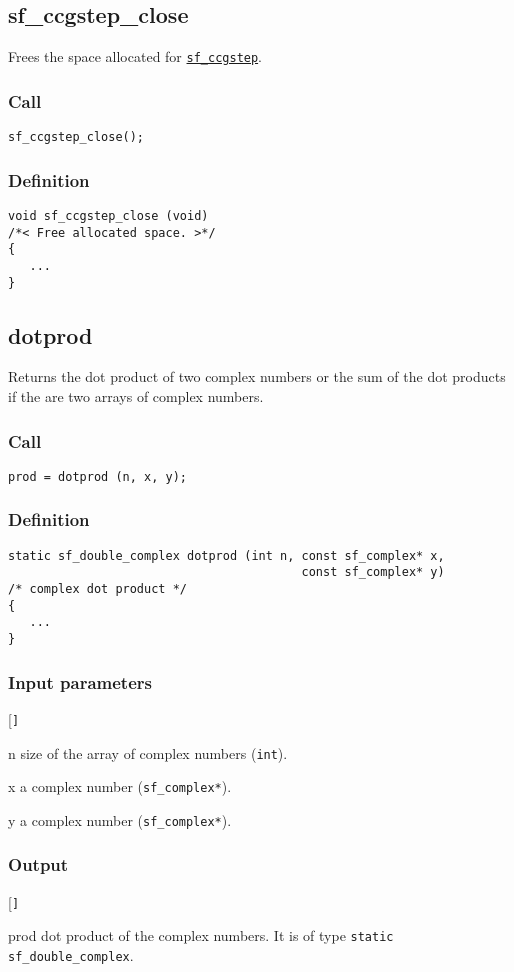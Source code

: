 \subsection{{sf\_ccgstep\_close}}
Frees the space allocated for \hyperref[sec:sf_ccgstep]{\texttt{sf\_ccgstep}}.

\subsubsection*{Call}
\begin{verbatim}sf_ccgstep_close();\end{verbatim}

\subsubsection*{Definition}
\begin{verbatim}
void sf_ccgstep_close (void) 
/*< Free allocated space. >*/ 
{
   ...
}
\end{verbatim}




\subsection{{dotprod}}
Returns the dot product of two complex numbers or the sum of the dot products if the are two arrays of complex numbers.

\subsubsection*{Call}
\begin{verbatim}prod = dotprod (n, x, y);\end{verbatim}

\subsubsection*{Definition}
\begin{verbatim}
static sf_double_complex dotprod (int n, const sf_complex* x, 
                                         const sf_complex* y)
/* complex dot product */
{
   ...
}
\end{verbatim}

\subsubsection*{Input parameters}
\begin{desclist}{\tt }{\quad}[\tt ]
   \setlength\itemsep{0pt}
   \item[n]  size of the array of complex numbers (\texttt{int}).  
   \item[x]  a complex number (\texttt{sf\_complex*}).  
   \item[y]  a complex number (\texttt{sf\_complex*}).  
\end{desclist}

\subsubsection*{Output}
\begin{desclist}{\tt }{\quad}[\tt ]
   \setlength\itemsep{0pt}  
   \item[prod] dot product of the complex numbers. It is of type \texttt{static sf\_double\_complex}.
\end{desclist}



